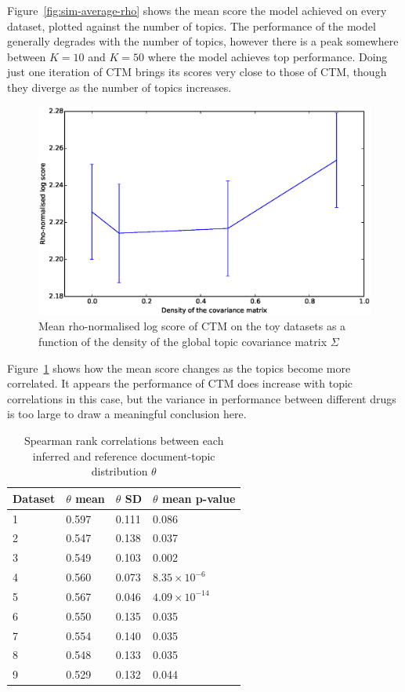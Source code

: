 \documentclass[12pt,a4paper,twoside,openright]{report}
\begin{document}
Figure~\ref{fig:sim-average-rho} shows the mean score the model achieved on every dataset, plotted against the number of topics. The performance of the model generally degrades with the number of topics, however there is a peak somewhere between $K=10$ and $K=50$ where the model achieves top performance. Doing just one iteration of CTM brings its scores very close to those of CTM, though they diverge as the number of topics increases.

\begin{figure}[!htb]
\includegraphics[width=\textwidth]{sim-sigmadensity-rho.eps}
\caption{Mean rho-normalised log score of CTM on the toy datasets as a function of the density of the global topic covariance matrix $\Sigma$}
\label{fig:sim-sigmadensity-rho}
\end{figure}

Figure~\ref{fig:sim-sigmadensity-rho} shows how the mean score changes as the topics become more correlated. It appears the performance of CTM does increase with topic correlations in this case, but the variance in performance between different drugs is too large to draw a meaningful conclusion here.

\begin{table}
\begin{tabular}{| l | l | l | l |}
\hline
Dataset & $\theta$ mean & $\theta$ SD & $\theta$ mean p-value \\
\hline
1 & 0.597 & 0.111 & 0.086\\
2 & 0.547 & 0.138 & 0.037 \\
3 & 0.549 & 0.103 & 0.002 \\
4 & 0.560 & 0.073 & $8.35 \times 10^{-6}$\\
5 & 0.567 & 0.046 & $4.09 \times 10^{-14}$\\
6 & 0.550 & 0.135 & 0.035 \\
7 & 0.554 & 0.140 & 0.035 \\
8 & 0.548 & 0.133 & 0.035\\
9 & 0.529 & 0.132 & 0.044\\
\hline
\end{tabular}
\caption{Spearman rank correlations between each inferred and reference document-topic distribution $\theta$}
\label{tab:sim-spearman-theta}
\end{table}
\end{document}
